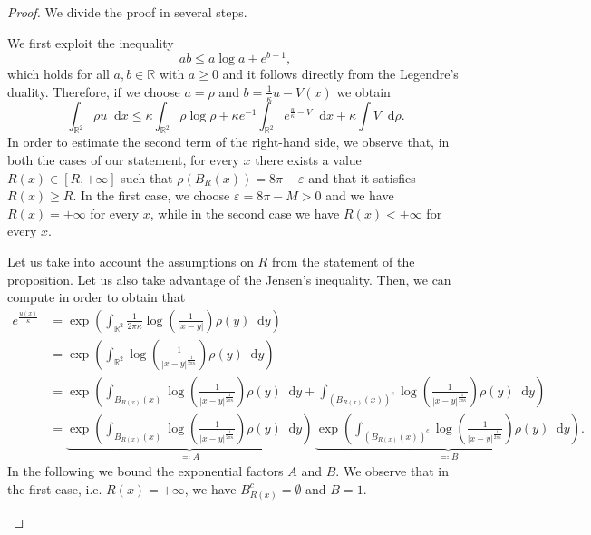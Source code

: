 \documentclass[10pt,a4paper]{amsart}
\newcommand{\R}{{\mathbb{R}}}
\newcommand{\f}{\frac}
\newcommand{\diff}{\mathop{}\!\mathrm{d}}
\newcommand{\ve}{\varepsilon}
\theoremstyle{plain}
\theoremstyle{remark}
\newcommand{\step}[1][]{%
  \if\relax\detokenize{#1}\relax
    \def\thisstep{.}%
  \else
    \def\thisstep{: \protect #1.}%
  \fi
  \item}
\begin{document}
\begin{proof}
We divide the proof in several steps.
\begin{enumeratesteps}
\step[Setting the inequality]
We first exploit the inequality 
$$
ab\le a\log a + e^{b-1}, 
$$
which holds for all $a,b \in \R$ with $a\ge 0$ and it follows directly from the Legendre's duality. Therefore, if we choose $a=\rho$ and $b=\f{1}{\kappa}u-V(x)$ we obtain
\begin{equation}\label{eq:Inequality for entropy}
    \int_{\R^2}\rho u\diff x \le \kappa\int_{\R^2}\rho\log\rho +\kappa e^{-1}\int_{\R^2}e^{\f{u}{\kappa}-V}\diff x+\kappa\int V\diff\rho. 
\end{equation}
In order to estimate the second term of the right-hand side, we observe that, in both the cases of our statement, for every $x$ there exists a value $R(x)\in [R,+\infty]$ such that $\rho(
B_{R}(x))= 8\pi-\varepsilon$ and that it satisfies $R(x)\ge R$. In the first case, we choose $\ve=8\pi-M>0$ and we have $R(x)=+\infty$ for every $x$, while in the second case we have $R(x)<+\infty$ for every $x$.

Let us take into account the assumptions on $R$ from the statement of the proposition. Let us also take advantage of the Jensen's inequality. Then, we can compute in order to obtain that  
\begin{align*}
    e^{\f{u(x)}{\kappa}}&=\exp\left(\int_{\R^2}\f{1}{2\pi\kappa}\log\left(\f{1}{|x-y|}\right)\rho(y)\diff y\right) \\
    & = \exp\left(\int_{\R^2}\log\left(\f{1}{|x-y|^{\f{1}{2\pi\kappa}}}\right)\rho(y)\diff y\right)\\
    & = \exp\left(\int_{B_{R(x)}(x)}\log\left(\f{1}{|x-y|^{\f{1}{2\pi\kappa}}}\right)\rho(y)\diff y+ \int_{(B_{R(x)}(x))^c}\log\left(\f{1}{|x-y|^{\f{1}{2\pi\kappa}}}\right)\rho(y)\diff y\right)\\
    & = \underbrace{\exp\left(\int_{B_{R(x)}(x)}\log\left(\f{1}{|x-y|^{\f{1}{2\pi\kappa}}}\right)\rho(y)\diff y\right)}_{\eqqcolon A} \, \underbrace{\exp\left( \int_{(B_{R(x)}(x))^c}\log\left(\f{1}{|x-y|^{\f{1}{2\pi\kappa}}}\right)\rho(y)\diff y\right)}_{\eqqcolon B}.
\end{align*}
In the following we bound the exponential factors $A$ and $B$. We observe that in the first case, i.e. $R(x) = + \infty$, we have $B_{R(x)}^c=\emptyset$ and $B=1$.


\end{enumeratesteps}
\end{proof}
\end{document}
